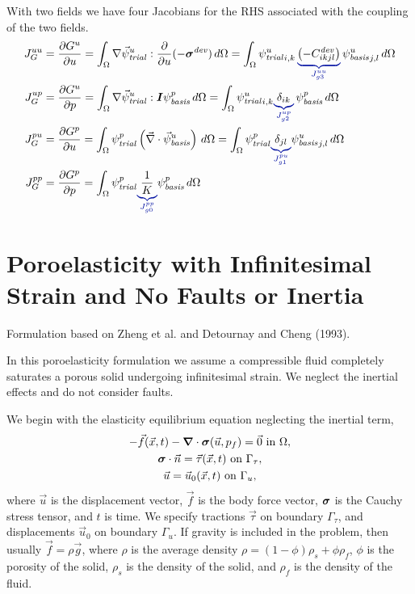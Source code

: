 With two fields we have four Jacobians for the RHS associated with the coupling of 
the two fields.
\begin{align}
  J_G^{uu} &= \frac{\partial G^u}{\partial u} = \int_\Omega \nabla \trialvec[u] : 
\frac{\partial}{\partial u}(-
\tensor{\sigma}^\mathit{dev}) \, d\Omega 
  = \int_\Omega \trialscalar[u]_{i,k} \, \eqnannotate{\left(-C^\mathit{dev}_{ikjl}\right)}
{J_{g3}^{uu}}  \, 
\basisscalar[u]_{j,l}\, d\Omega \\
  J_G^{up} &= \frac{\partial G^u}{\partial p} = \int_\Omega \nabla\trialvec[u] : \tensor{I} 
\basisscalar[p] \,  d\Omega = \int_\Omega \trialscalar[u]_{i,k} \eqnannotate{\delta_{ik}}{J_{g2}^{up}} \, 
\basisscalar[p] \, d\Omega \\
%
  J_G^{pu} &= \frac{\partial G^p}{\partial u} = \int_\Omega \trialscalar[p] \left(\vec{\nabla} 
\cdot \basisvec[u]\right) \, d\Omega = \int_\Omega \trialscalar[p] \eqnannotate{\delta_{jl}}{J_{g1}^{pu}} 
\basisscalar[u]_{j,l} \, d\Omega\\
  J_G^{pp} &= \frac{\partial G^p}{\partial p} = \int_\Omega \trialscalar[p] \eqnannotate{\frac{1}
{K}}{J_{g0}^{pp}} \basisscalar[p] \, d\Omega
\end{align}


\section{Poroelasticity with Infinitesimal Strain and No Faults or Inertia}


Formulation based on Zheng et al. and Detournay and Cheng (1993).

In this poroelasticity formulation we assume a compressible fluid
completely saturates a porous solid undergoing infinitesimal
strain. We neglect the inertial effects and do not consider faults.

We begin with the elasticity equilibrium equation neglecting the inertial term,
\begin{gather}
  - \vec{f}(\vec{x},t) - \tensor{\nabla} \cdot \tensor{\sigma}(\vec{u},p_f) = \vec{0} 
\text{ in }\Omega, \\
%
  \tensor{\sigma} \cdot \vec{n} = \vec{\tau}(\vec{x},t) \text{ on }\Gamma_\tau, \\
%
  \vec{u} = \vec{u}_0(\vec{x},t) \text{ on }\Gamma_u,
\end{gather}
where $\vec{u}$ is the displacement vector, $\vec{f}$ is the body
force vector, $\bm{\sigma}$ is the Cauchy stress tensor, and $t$
is time. We specify tractions $\vec{\tau}$ on boundary $\Gamma_\tau$, and
displacements $\vec{u}_0$ on boundary $\Gamma_u$. If gravity is included in
the problem, then usually $\vec{f} = \rho \vec{g}$, where $\rho$ is
the average density $\rho = (1-\phi)\rho_s + \phi \rho_f$, $\phi$ is
the porosity of the solid, $\rho_s$ is the density of the solid, and
$\rho_f$ is the density of the fluid.


